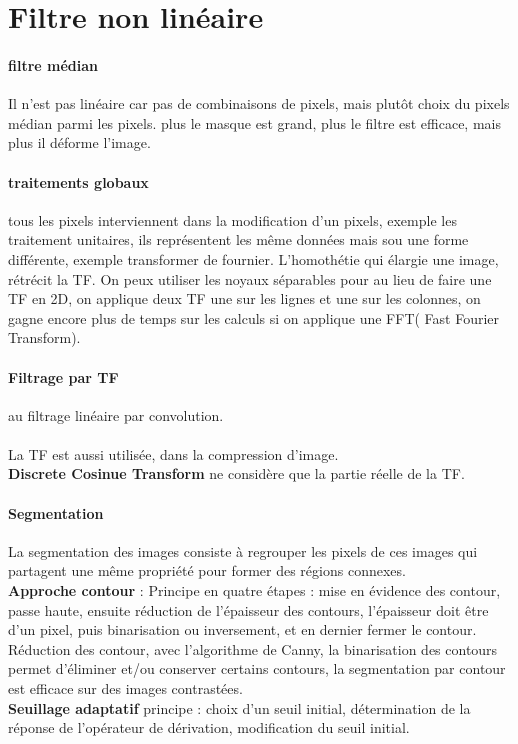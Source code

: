 \documentclass{article}
\begin{document}
\section{Filtre non linéaire}
\paragraph{filtre médian} Il n'est pas linéaire car pas de combinaisons de pixels,  mais plutôt choix du pixels médian parmi les pixels. plus le masque est grand, plus le filtre est efficace, mais plus il déforme l'image.
\paragraph{traitements globaux} tous les pixels interviennent dans la modification d'un pixels, exemple les traitement unitaires, ils représentent les même données mais sou une forme différente, exemple transformer de fournier. L’homothétie qui élargie une image, rétrécit la TF. On peux utiliser les noyaux séparables pour au lieu de faire une TF en 2D, on applique deux TF une sur les lignes et une sur les colonnes, on gagne encore plus de temps sur les calculs si on applique une FFT( Fast Fourier Transform).
\paragraph{Filtrage par TF} au filtrage linéaire par convolution. \\\\ La TF est aussi utilisée, dans la compression d'image.\\\textbf{Discrete Cosinue Transform} ne considère que la partie réelle de la TF.

\paragraph{Segmentation}
La segmentation des images consiste à regrouper les pixels de ces images qui partagent une même propriété pour former des régions connexes.\\\textbf{Approche contour} : Principe en quatre étapes : mise en évidence des contour, passe haute, ensuite réduction de l'épaisseur des contours, l'épaisseur doit être d'un pixel, puis binarisation ou inversement, et en dernier fermer le contour. Réduction des contour, avec l'algorithme de Canny, la binarisation des contours permet d'éliminer et/ou conserver certains contours, la segmentation par contour est efficace sur des images contrastées.\\\textbf{Seuillage adaptatif} principe : choix d'un seuil initial, détermination de la réponse de l'opérateur de dérivation, modification du seuil initial. 
\end{document}
